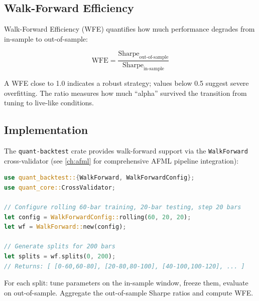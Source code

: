 \subsection{Walk-Forward Efficiency}


Walk-Forward Efficiency (WFE) quantifies how much performance degrades from
in-sample to out-of-sample:

\begin{equation}
\text{WFE} = \frac{\text{Sharpe}_{\text{out-of-sample}}}{\text{Sharpe}_{\text{in-sample}}}
\end{equation}

A WFE close to 1.0 indicates a robust strategy; values below 0.5 suggest
severe overfitting. The ratio measures how much ``alpha'' survived the
transition from tuning to live-like conditions.

\subsection{Implementation}

The \texttt{quant-backtest} crate provides walk-forward support via the
\texttt{WalkForward} cross-validator (see \cref{ch:afml} for
comprehensive AFML pipeline integration):

\begin{lstlisting}[language=Rust]
use quant_backtest::{WalkForward, WalkForwardConfig};
use quant_core::CrossValidator;

// Configure rolling 60-bar training, 20-bar testing, step 20 bars
let config = WalkForwardConfig::rolling(60, 20, 20);
let wf = WalkForward::new(config);

// Generate splits for 200 bars
let splits = wf.splits(0, 200);
// Returns: [ [0-60,60-80], [20-80,80-100], [40-100,100-120], ... ]
\end{lstlisting}

For each split: tune parameters on the in-sample window, freeze them, evaluate
on out-of-sample. Aggregate the out-of-sample Sharpe ratios and compute WFE.

